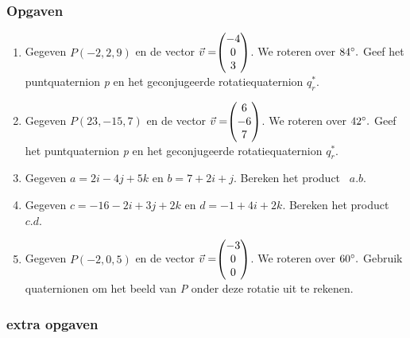 \subsubsection{Opgaven}
\begin{enumerate}
	\item Gegeven $ P (-2, 2, 9) $ en de vector $\vec{v} = \vecdrie{-4}{0}{3} $. 
	We roteren over $ 84\degree. $ Geef het puntquaternion \textit{p} en het geconjugeerde rotatiequaternion  $  q_r^* $.
	\item Gegeven $ P (23, -15, 7) $ en de vector $\vec{v} = \vecdrie{6}{-6}{7} $. 
	We roteren over $ 42\degree. $ Geef het puntquaternion \textit{p} en het geconjugeerde rotatiequaternion  $  q_r^* $.
	
	\item Gegeven $ a = 2i-4j+5k$ en   $ b = 7+2i+j $. 
	Bereken het product \ $  a.b $.
	\item Gegeven $ c = -16 -2i+3j+2k $ en   $ d = -1+4i+2k $. 
	Bereken het product \ $  c.d $.
	
	\item Gegeven $ P (-2, 0, 5) $ en de vector $\vec{v} = \vecdrie{-3}{0}{0} $. 
	We roteren over $ 60\degree. $ Gebruik quaternionen om het beeld van \textit{P }onder deze rotatie uit te rekenen.
	
\end{enumerate}

\subsubsection{extra opgaven}


